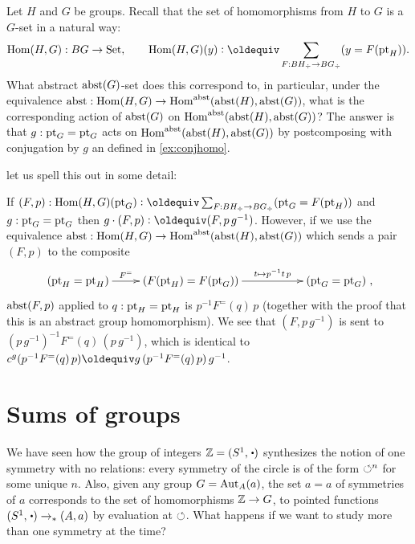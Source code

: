 \begin{example}
  \label{ex:abstrandconj}
  Let $H$ and $G$ be groups.  Recall that the set of homomorphisms from $H$ to $G$ is a $G$-set in a natural way:
$$\Hom(H,G):BG\to\Set,\qquad \Hom(H,G)(y)\defequi \sum_{F:BH_\div\to BG_\div}(y=F(\pt_H)).$$
What abstract $\mathrm{abst}(G)$-set does this correspond to, in particular, under the equivalence $\mathrm{abst}:\mathrm{Hom}(H,G)\to\mathrm{Hom}^{\mathrm{abst}}(\mathrm{abst}(H),\mathrm{abst}(G))$, what is the corresponding action of $\mathrm{abst}(G)$ on $\mathrm{Hom}^{\mathrm{abst}}(\mathrm{abst}(H),\mathrm{abst}(G))$?  The answer is that $g:{\mathord{\mathrm{pt}}}_G={\mathord{\mathrm{pt}}}_G$ acts on $\mathrm{Hom}^{\mathrm{abst}}(\mathrm{abst}(H),\mathrm{abst}(G))$ by postcomposing with conjugation by $g$ an defined in \cref{ex:conjhomo}.  

let us spell this out in some detail:

If $(F,p):\Hom(H,G)(\pt_G)\defequi
 \sum_{F:BH_\div\to BG_\div}(\pt_G=F(\pt_H))$ and $g:{\mathord{\mathrm{pt}}}_G={\mathord{\mathrm{pt}}}_G$ then $g\cdot(F,p)\defequi(F,p\,g^{-1})$.  However, if we use the equivalence $\mathrm{abst}:\mathrm{Hom}(H,G)\to\mathrm{Hom}^{\mathrm{abst}}(\mathrm{abst}(H),\mathrm{abst}(G))$ which sends a pair $(F,p)$ to the composite 
$$\xymatrix{(\pt_H=\pt_H)\ar[r]^-{F^=}&(F(\pt_H)=F(\pt_G))\ar[rr]^-{t\mapsto p^{-1}t\,p}&&(\pt_G=\pt_G)},$$ \ie $\mathrm{abst}(F,p)$ applied to $q:{\mathord{\mathrm{pt}}}_H={\mathord{\mathrm{pt}}}_H $ is  $p^{-1}F^=(q)\,p$   (together with the proof that this is an abstract group homomorphism).  We see that $(F,p\,g^{-1})$ is sent to $(p\,g^{-1})^{-1}F^=(q)\,(p\,g^{-1})$, which is identical to $c^g(p^{-1}F^=(q)\,p)\oldequiv g\,(p^{-1}F^=(q)\,p)\,g^{-1}$.
\end{example}



\section{Sums of groups}
\label{sec:coprod}
We have seen how the group of integers $\ZZ=(S^1,\base)$ synthesizes the notion of one symmetry with no relations: every symmetry of the circle is of the form $\circlearrowleft^n$ for some unique $n$.  Also, given any group $G=\mathrm{Aut}_A(a)$, the set $a=a$ of symmetries of $a$ corresponds to the set of homomorphisms $\mathbb{Z}\to G$, \ie to pointed functions $(S^1,\base)\to_*(A,a)$ by evaluation at $\circlearrowleft$.  What happens if we want to study more than one symmetry at the time?  

